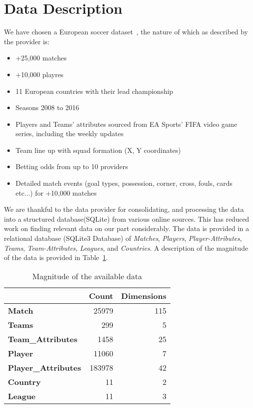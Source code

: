 \documentclass[11pt]{article}
\begin{document}
\section{Data Description}
We have chosen a European soccer dataset~\cite{mathien1}, the nature of which as described by the provider is:
\begin{itemize}
  \setlength\itemsep{0em}
  \item{+25,000 matches}
  \item{+10,000 playres}
  \item{11 European countries with their lead championship}
  \item{Seasons 2008 to 2016}
  \item{Players and Teams' attributes sourced from EA Sports' FIFA video game series, including the weekly updates}
  \item{Team line up with squad formation (X, Y coordinates)}
  \item{Betting odds from up to 10 providers}
  \item{Detailed match events (goal types, possession, corner, cross, fouls, cards etc...) for +10,000 matches}
\end{itemize}
We are thankful to the data provider for consolidating, and processing the data into a structured database(SQLite) from various online sources. This has reduced work on finding relevant data on our part considerably.
\newline
\newline
The data is provided in a relational database (SQLite3 Database) of \textit{Matches}, \textit{Players}, \textit{Player-Attributes}, \textit{Teams}, \textit{Team-Attributes}, \textit{Leagues}, and \textit{Countries}.
A description of the magnitude of the data is provided in Table~\ref{tab:data-desc}.

\begin{table}[ht]
\centering
\begin{tabular}{|l|r|r|}
\hline
\textbf{}                   & \textbf{Count} & \textbf{Dimensions} \\ \hline
\textbf{Match}              & 25979          & 115                 \\ \hline
\textbf{Teams}              & 299            & 5                   \\ \hline
\textbf{Team\_Attributes}   & 1458           & 25                  \\ \hline
\textbf{Player}             & 11060          & 7                   \\ \hline
\textbf{Player\_Attributes} & 183978         & 42                  \\ \hline
\textbf{Country}            & 11             & 2                   \\ \hline
\textbf{League}             & 11             & 3                   \\ \hline
\end{tabular}
\caption{Magnitude of the available data}
\label{tab:data-desc}
\end{table}
\end{document}
